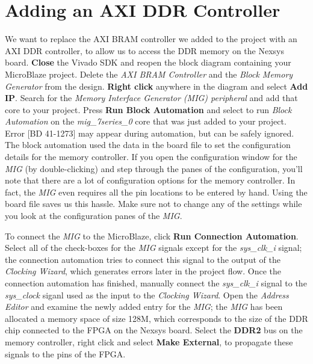\documentclass[11pt]{article}
\begin{document}
\section{Adding an AXI DDR Controller}
\label{sec:add_ddr}
We want to replace the AXI BRAM controller we added to the project with an AXI DDR controller, to allow us to access the DDR memory on the Nexsys board. \textbf{Close} the Vivado SDK and reopen the block diagram containing your MicroBlaze project. Delete the \textit{AXI BRAM Controller} and the \textit{Block Memory Generator} from the design. \textbf{Right click} anywhere in the diagram and select \textbf{Add IP}. Search for the \textit{Memory Interface Generator (MIG) peripheral} and add that core to your project. Press \textbf{Run Block Automation} and select to run \textit{Block Automation} on the \textit{mig\_7series\_0} core that was just added to your project. Error [BD 41-1273] may appear during automation, but can be safely ignored. The block automation used the data in the board file to set the configuration details for the memory controller. If you open the configuration window for the \textit{MIG} (by double-clicking) and step through the panes of the configuration, you'll note that there are a lot of configuration options for the memory controller. In fact, the \textit{MIG} even requires all the pin locations to be entered by hand. Using the board file saves us this hassle. Make sure not to change any of the settings while you look at the configuration panes of the \textit{MIG}.

To connect the \textit{MIG} to the MicroBlaze, click \textbf{Run Connection Automation}. Select all of the check-boxes for the \textit{MIG} signals except for the \textit{sys\_clk\_i} signal; the connection automation tries to connect this signal to the output of the \textit{Clocking Wizard}, which generates errors later in the project flow. Once the connection automation has finished, manually connect the \textit{sys\_clk\_i} signal to the \textit{sys\_clock} siganl used as the input to the \textit{Clocking Wizard}. Open the \textit{Address Editor} and examine the newly added entry for the \textit{MIG}; the \textit{MIG} has been allocated a memory space of size 128M, which corresponds to the size of the DDR chip connected to the FPGA on the Nexsys board. Select the \textbf{DDR2} bus on the memory controller, right click and select \textbf{Make External}, to propagate these signals to the pins of the FPGA.
\end{document}
